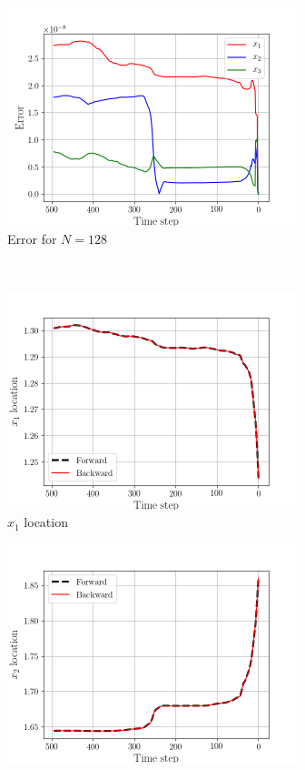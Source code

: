 \begin{figure}[H]
    \begin{subfigure}[H]{0.45\textwidth}
        \includegraphics[height=2.5in]{media/rk4/DS-N-128/error-128.png}
        \caption{Error for $N=128$}
    \end{subfigure}
    ~
    \begin{subfigure}[H]{0.45\textwidth}
        \includegraphics[height=2.5in]{media/rk4/DS-N-128/x1-location.png}
        \caption{$x_{1}$ location}
    \end{subfigure}
    \newline
    \begin{subfigure}[H]{0.45\textwidth}
        \includegraphics[height=2.5in]{media/rk4/DS-N-128/x2-location.png}

\end{subfigure}
\end{figure}
